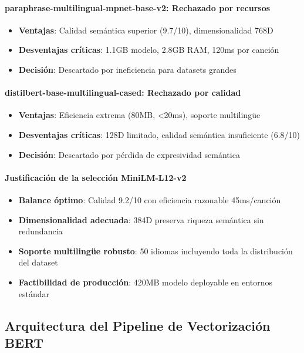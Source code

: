 \documentclass[12pt,a4paper]{article}
\begin{document}
\paragraph{paraphrase-multilingual-mpnet-base-v2: Rechazado por recursos}
\begin{itemize}
    \item \textbf{Ventajas}: Calidad semántica superior (9.7/10), dimensionalidad 768D
    \item \textbf{Desventajas críticas}: 1.1GB modelo, 2.8GB RAM, 120ms por canción
    \item \textbf{Decisión}: Descartado por ineficiencia para datasets grandes
\end{itemize}

\paragraph{distilbert-base-multilingual-cased: Rechazado por calidad}
\begin{itemize}
    \item \textbf{Ventajas}: Eficiencia extrema (80MB, <20ms), soporte multilingüe
    \item \textbf{Desventajas críticas}: 128D limitado, calidad semántica insuficiente (6.8/10)
    \item \textbf{Decisión}: Descartado por pérdida de expresividad semántica
\end{itemize}

\paragraph{Justificación de la selección MiniLM-L12-v2}
\begin{itemize}
    \item \textbf{Balance óptimo}: Calidad 9.2/10 con eficiencia razonable 45ms/canción
    \item \textbf{Dimensionalidad adecuada}: 384D preserva riqueza semántica sin redundancia
    \item \textbf{Soporte multilingüe robusto}: 50 idiomas incluyendo toda la distribución del dataset
    \item \textbf{Factibilidad de producción}: 420MB modelo deployable en entornos estándar
\end{itemize}

\subsection{Arquitectura del Pipeline de Vectorización BERT}
\end{document}
